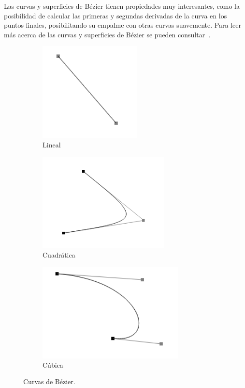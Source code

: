 Las curvas y superficies de Bézier tienen propiedades muy interesantes, como la
posibilidad de calcular las primeras y segundas derivadas de la curva en los
puntos finales, posibilitando su empalme con otras curvas suavemente. Para leer
más acerca de las curvas y superficies de Bézier se pueden
consultar~\citet{HEARN,Bailey}.

\begin{figure}[t]
		\centering
	\begin{subfigure}[b]{.3\textwidth}
			\includegraphics[height=5cm,width=\textwidth]{figures/bezier1.png}
			\caption{Lineal}
			\label{fig:bezier1}
	\end{subfigure}
	\begin{subfigure}[b]{.3\textwidth}
			\includegraphics[height=5cm,width=\textwidth]{figures/bezier2.png}
			\caption{Cuadrática}
			\label{fig:bezier2}
	\end{subfigure}
	\begin{subfigure}[b]{.3\textwidth}
			\includegraphics[height=5cm,width=\textwidth]{figures/bezier3.png}
			\caption{Cúbica}
			\label{fig:bezier3}
	\end{subfigure}
	\caption{Curvas de Bézier.}
	\label{fig:bezier}
\end{figure}

